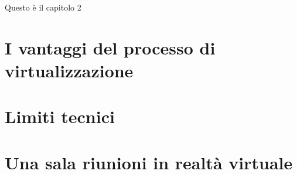 Questo è il capitolo 2
\section{I vantaggi del processo di virtualizzazione}
\section{Limiti tecnici}
\section{Una sala riunioni in realtà virtuale}

